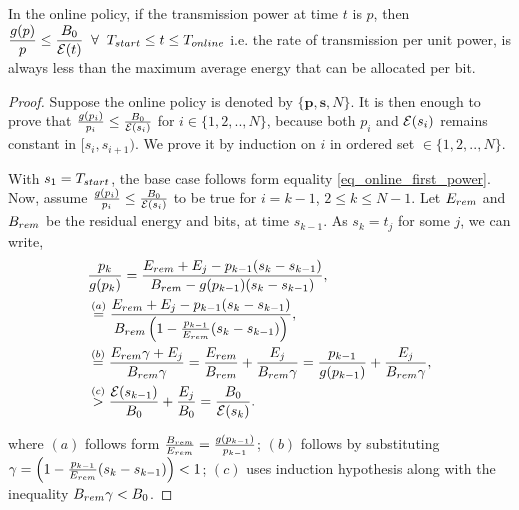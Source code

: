 \begin{lemma}
In the online policy, if the transmission power at time $t$ is $p$, then $\dfrac{g(p)}{p} \le \dfrac{B_0}{\ETx(t)}\;\;\forall\;\; T_{\mbox{\scriptsize{start}}}\le t\le T_{\mbox{\scriptsize{online}}}$ i.e. the rate of transmission per unit power, is always less than the maximum average energy that can be allocated per bit.
\label{lemma_online_inequality}
\end{lemma}




\begin{proof}
Suppose the online policy is denoted by $\{\bm{p},\bm{s},N\}$. It is then enough to prove that $\frac{g(p_i)}{p_i} \le \frac{B_0}{\mathcal{E}(s_i)}$ for $i\in\{1,2,..,N\} $, because both $p_i$ and $\mathcal{E}(s_i)$ remains constant in $[s_i,s_{i+1})$. We prove it by induction on $i$ in ordered set $\in \{1,2,..,N\}$. 

With $s_1=T_{\mbox{\scriptsize{start}}}$, the base case follows form equality \eqref{eq_online_first_power}. Now, assume $\frac{g(p_i)}{p_i}\le \frac{B_0}{\mathcal{E}(s_i)}$ to be true for $i=k-1$, $2 \le k\le N-1$. Let $E_{\mbox{\scriptsize{rem}}}$ and $B_{\mbox{\scriptsize{rem}}}$ be the residual energy and bits, at time $s_{k-1}$. As $s_k=t_j$ for some $j$, we can write,
\begin{align*}
&\frac{p_{k}}{g(p_{k})}=\frac{E_{\mbox{\scriptsize{rem}}}+E_{j}-p_{k-1} (s_k-s_{k-1})}{B_{\mbox{\scriptsize{rem}}}-g(p_{k-1}) (s_k-s_{k-1})},
\\
&\stackrel{(a)}{=}\frac{E_{\mbox{\scriptsize{rem}}}+E_{j}-p_{k-1} (s_k-s_{k-1})}{B_{\mbox{\scriptsize{rem}}}\left( 1-\frac{p_{k-1}}{E_{\mbox{\scriptsize{rem}}}} (s_k-s_{k-1})\right) },
\\
&\stackrel{(b)}{=}\frac{E_{\mbox{\scriptsize{rem}}}\gamma+E_{j}}{B_{\mbox{\scriptsize{rem}}}\gamma }=\frac{E_{\mbox{\scriptsize{rem}}}}{B_{\mbox{\scriptsize{rem}}}}+\frac{E_{j}}{B_{\mbox{\scriptsize{rem}}}\gamma}=\frac{p_{k-1}}{g(p_{k-1})}+\frac{E_{j}}{B_{\mbox{\scriptsize{rem}}}\gamma},
\\
&\stackrel{(c)}{>}\frac{\ETx(s_{k-1})}{B_0}+\frac{E_{j}}{B_0}=\frac{B_0}{{\ETx(s_{k})}}.
\end{align*}

where $(a)$ follows form $\frac{B_{\mbox{\scriptsize{rem}}}}{E_{\mbox{\scriptsize{rem}}}}=\frac{g(p_{k-1})}{p_{k-1}}$; $(b)$ follows by substituting $\gamma=\left( 1-\frac{p_{k-1}}{E_{\mbox{\scriptsize{rem}}}} (s_k-s_{k-1})\right)< 1$;  $(c)$ uses induction hypothesis along with the inequality $B_{\mbox{\scriptsize{rem}}}\gamma< B_0$.
\end{proof}



